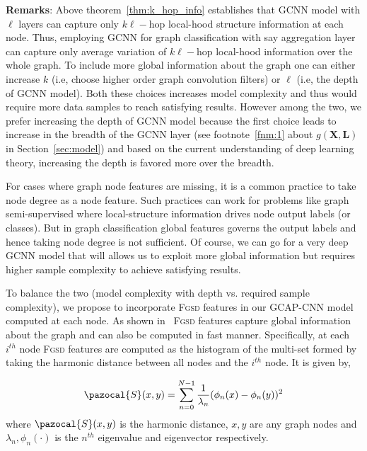 \documentclass{article}
\newcommand{\Sa}{\pazocal{S}}
\begin{document}
\noindent \textbf{Remarks}: Above theorem~\ref{thm:k_hop_info} establishes that  GCNN model with $\ell$ layers can capture only $k\ell-$hop local-hood structure information at each node. Thus, employing GCNN for graph classification with say aggregation layer can capture only   average variation of $k\ell-$hop local-hood information over the whole graph. To include more  global information   about the graph one can either increase $k$ (i.e, choose higher order graph convolution filters) or $\ell$ (i.e, the depth of GCNN model). Both these choices increases model complexity and thus would require more data samples to reach satisfying results. However among the two, we prefer increasing the depth of GCNN model because the first choice leads to increase in the breadth of the GCNN layer (see footnote~\ref{fnm:1} about $g(\mathbf{X}, \mathbf{L})$ in Section~\ref{sec:model}) and based on the current understanding of deep learning theory, increasing the depth is   favored more over  the breadth.   


 
For cases  where graph node features are missing, it is a common practice to take node degree as a node feature. Such practices can work for problems like graph semi-supervised where local-structure information drives node output labels (or classes). But in graph classification global features governs the output labels and hence taking node degree is not sufficient. Of course, we can go for a very deep GCNN model that will allows us to exploit more global information but requires higher sample  complexity to achieve satisfying results. 

To balance the two (model complexity with depth vs. required sample complexity), we propose to incorporate \textsc{Fgsd} features in our GCAP-CNN model   computed  at each node. As shown in~\cite{verma2017hunt} \textsc{Fgsd} features capture global information about the graph and can also be computed in fast manner. Specifically, at each  $i^{th}$ node   \textsc{Fgsd} features are computed  as the histogram of the multi-set formed by taking the harmonic distance between all   nodes and the $i^{th}$ node. It is given by, 

\begin{equation}{\label{eq:spectral}}
\Sa(x,y)=\sum_{n=0}^{N-1} \frac{1}{\lambda_n} (\phi_n(x)-\phi_n(y))^2   \\
\end{equation}
where $\Sa(x,y)$ is the harmonic distance,  $x,y$ are any graph nodes and  ${\lambda_n},\phi_n(\cdot)$ is the $n^{th}$ eigenvalue and eigenvector respectively. 
\end{document}
